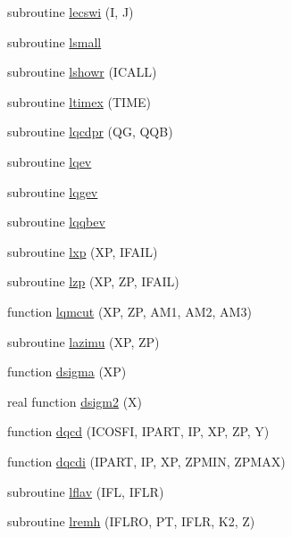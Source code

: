 \begin{DoxyCompactItemize}
\item 
subroutine \hyperlink{djangoh__l_8f_a5df9e96aec176c76cffd7bd51775500a}{lecswi} (I, J)
\item 
subroutine \hyperlink{djangoh__l_8f_abe7e3135bb62ff0df78888cff990a5dc}{lsmall}
\item 
subroutine \hyperlink{djangoh__l_8f_aa0ba547c1a303967f78477246079eab9}{lshowr} (I\+C\+A\+L\+L)
\item 
subroutine \hyperlink{djangoh__l_8f_a08fec3dff1a4d1cc56eb1387e95550cf}{ltimex} (T\+I\+M\+E)
\item 
subroutine \hyperlink{djangoh__l_8f_a028774669b878dc254be7adc6a8b71fc}{lqcdpr} (Q\+G, Q\+Q\+B)
\item 
subroutine \hyperlink{djangoh__l_8f_a01abaac24ae901949706dffdf91c7743}{lqev}
\item 
subroutine \hyperlink{djangoh__l_8f_a23666489567c7a0e59195b6fd2173242}{lqgev}
\item 
subroutine \hyperlink{djangoh__l_8f_a3e28d56ef10931205d7a8812c117d667}{lqqbev}
\item 
subroutine \hyperlink{djangoh__l_8f_a48c1ad848298468cd3e394bccf6f5c0c}{lxp} (X\+P, I\+F\+A\+I\+L)
\item 
subroutine \hyperlink{djangoh__l_8f_a9a5bd2fc14de05db3e3517f441e0b4fa}{lzp} (X\+P, Z\+P, I\+F\+A\+I\+L)
\item 
function \hyperlink{djangoh__l_8f_a541c93d482139591c721854c34c5602b}{lqmcut} (X\+P, Z\+P, A\+M1, A\+M2, A\+M3)
\item 
subroutine \hyperlink{djangoh__l_8f_a362776648d80c982707ecbb3966e4485}{lazimu} (X\+P, Z\+P)
\item 
function \hyperlink{djangoh__l_8f_ae36552d48c86e467c1368e28727993fa}{dsigma} (X\+P)
\item 
real function \hyperlink{djangoh__l_8f_a3ae1de6009d8e73a2782ba12c5587ef2}{dsigm2} (X)
\item 
function \hyperlink{djangoh__l_8f_a53c2f56342fc25a988f9bc43320a8b3e}{dqcd} (I\+C\+O\+S\+F\+I, I\+P\+A\+R\+T, I\+P, X\+P, Z\+P, Y)
\item 
function \hyperlink{djangoh__l_8f_a0f3016de25315e77ff3ed85e168e78e6}{dqcdi} (I\+P\+A\+R\+T, I\+P, X\+P, Z\+P\+M\+I\+N, Z\+P\+M\+A\+X)
\item 
subroutine \hyperlink{djangoh__l_8f_a2f0e84e9b484d85d15f8ac53db3fc90c}{lflav} (I\+F\+L, I\+F\+L\+R)
\item 
subroutine \hyperlink{djangoh__l_8f_a906c87082ea73a4b56c8e5ae5220dcce}{lremh} (I\+F\+L\+R\+O, P\+T, I\+F\+L\+R, K2, Z)
\item 

\end{DoxyCompactItemize}
